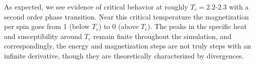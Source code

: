 \documentclass[twocolumn,aps]{revtex4-1} %
\begin{document}
As expected, we see evidence of critical behavior at roughly $T_c = 2.2$-$2.3$ with a second order phase transition. Near this critical temperature the magnetization per spin goes from 1 (below $T_c$) to 0 (above $T_c$). The peaks in the specific heat and susceptibility around $T_c$ remain finite throughout the simulation, and correspondingly, the energy and magnetization steps are not truly steps with an infinite derivative, though they are theoretically characterized by divergences. 

%
\end{document}
